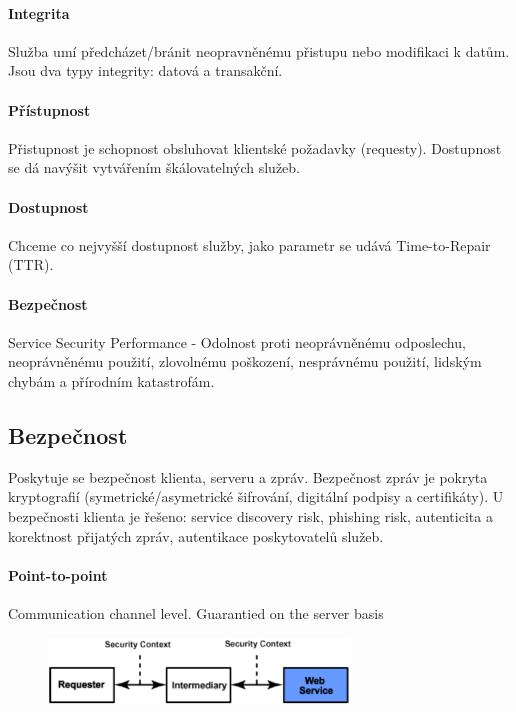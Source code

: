 \paragraph{Integrita}
Služba umí předcházet/bránit neopravněnému přistupu nebo modifikaci k datům. Jsou dva typy integrity: datová a transakční.

\paragraph{Přístupnost}
Přistupnost je schopnost obsluhovat klientské požadavky (requesty). Dostupnost se dá navýšit vytvářením škálovatelných služeb.

\paragraph{Dostupnost}
Chceme co nejvyšší dostupnost služby, jako parametr se udává Time-to-Repair (TTR).

\paragraph{Bezpečnost}
Service Security Performance - Odolnost proti neoprávněnému odposlechu, neoprávněnému použití, zlovolnému poškození, nesprávnému použití, lidským chybám a přírodním katastrofám.

\subsection{Bezpečnost}
Poskytuje se bezpečnost klienta, serveru a zpráv. Bezpečnost zpráv je pokryta kryptografií (symetrické/asymetrické šifrování, digitální podpisy a certifikáty). U bezpečnosti klienta je řešeno: service discovery risk, phishing risk, autenticita a korektnost přijatých zpráv, autentikace poskytovatelů služeb.


\paragraph{Point-to-point}
Communication channel level. Guarantied on the server basis
\begin{figure}[h!]
\centering
\includegraphics[width=80mm]{12/images/security-p2p}
\end{figure}

